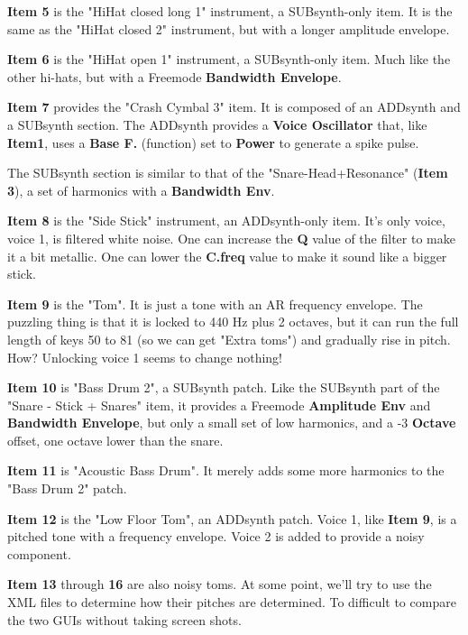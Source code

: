    \textbf{Item 5} is the "HiHat closed long 1" instrument, a SUBsynth-only
   item.  It is the same as the "HiHat closed 2" instrument, but with a
   longer amplitude envelope.

   \textbf{Item 6} is the "HiHat open 1" instrument, a SUBsynth-only item.
   Much like the other hi-hats, but with a Freemode
   \textbf{Bandwidth Envelope}.

   \textbf{Item 7} provides the "Crash Cymbal 3" item.
   It is composed of an ADDsynth and a SUBsynth section.
   The ADDsynth provides a \textbf{Voice Oscillator} that, like
   \textbf{Item1}, uses a 
   \textbf{Base F.} (function)
   set to \textbf{Power}
   to generate a spike pulse.

   The SUBsynth section is similar to that of the
   "Snare-Head+Resonance" (\textbf{Item 3}), a set of
   harmonics with a \textbf{Bandwidth Env}.

   \textbf{Item 8} is the "Side Stick" instrument, an ADDsynth-only item.
   It's only voice, voice 1, is filtered white noise.
   One can increase the \textbf{Q} value of the filter to make it a bit
   metallic.  One can lower the \textbf{C.freq} value to make it sound like
   a bigger stick.

   \textbf{Item 9} is the "Tom".  It is just a tone with an AR frequency
   envelope.  The puzzling thing is that it is locked to 440 Hz plus 2
   octaves, but it can run the full length of keys 50 to 81 (so we can get
   "Extra toms") and gradually rise in pitch.  How?  Unlocking voice 1 seems
   to change nothing!

   \textbf{Item 10} is "Bass Drum 2", a SUBsynth patch.
   Like the SUBsynth part of the "Snare - Stick + Snares" item, it provides
   a Freemode \textbf{Amplitude Env} and \textbf{Bandwidth Envelope}, but
   only a small set of low harmonics, and a -3 \textbf{Octave} offset, one
   octave lower than the snare.

   \textbf{Item 11} is "Acoustic Bass Drum".  It merely adds some more
   harmonics to the "Bass Drum 2" patch.

   \textbf{Item 12} is the "Low Floor Tom", an ADDsynth patch.
   Voice 1, like \textbf{Item 9}, is a pitched tone with a frequency
   envelope.  Voice 2 is added to provide a noisy component.

   \textbf{Item 13} through \textbf{16} are also noisy toms.
   At some point, we'll try to use the XML files to determine how their
   pitches are determined.  To difficult to compare the two GUIs without
   taking screen shots.

